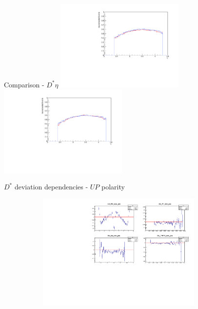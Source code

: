 \documentclass[11pt]{beamer}
\begin{document}
\begin{frame}{Comparison - $D^* \eta$}
\centering
\includegraphics[width=0.48\textwidth]{up_pdf/combined/h_eta_reco_Dst.pdf}
\includegraphics[width=0.48\textwidth]{down_pdf/combined/h_eta_reco_Dst.pdf}
\end{frame}
\begin{frame}{$D^*$ deviation dependencies - $UP$ polarity}
\begin{figure}
\begin{subfigure}{1.20\textwidth}
\includegraphics[width=0.9\textwidth]{histoUP2/asymmetriesDST.pdf}
\end{subfigure}
\end{figure}
\end{frame}
\end{document}
